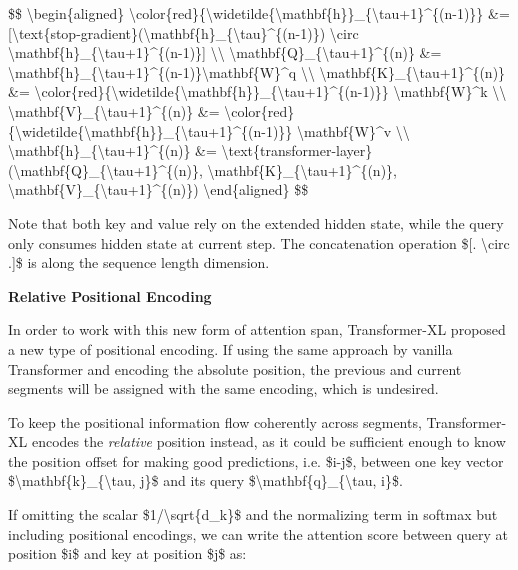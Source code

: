\$\$ \textbackslash begin\{aligned\} \textbackslash color\{red\}\{\textbackslash widetilde\{\textbackslash mathbf\{h\}\}\_\{\textbackslash tau+1\}\^{}\{(n-1)\}\} \&= {[}\textbackslash text\{stop-gradient\}(\textbackslash mathbf\{h\}\_\{\textbackslash tau\}\^{}\{(n-1)\}) \textbackslash circ \textbackslash mathbf\{h\}\_\{\textbackslash tau+1\}\^{}\{(n-1)\}{]} \textbackslash\textbackslash{} \textbackslash mathbf\{Q\}\_\{\textbackslash tau+1\}\^{}\{(n)\} \&= \textbackslash mathbf\{h\}\_\{\textbackslash tau+1\}\^{}\{(n-1)\}\textbackslash mathbf\{W\}\^{}q \textbackslash\textbackslash{} \textbackslash mathbf\{K\}\_\{\textbackslash tau+1\}\^{}\{(n)\} \&= \textbackslash color\{red\}\{\textbackslash widetilde\{\textbackslash mathbf\{h\}\}\_\{\textbackslash tau+1\}\^{}\{(n-1)\}\} \textbackslash mathbf\{W\}\^{}k \textbackslash\textbackslash{} \textbackslash mathbf\{V\}\_\{\textbackslash tau+1\}\^{}\{(n)\} \&= \textbackslash color\{red\}\{\textbackslash widetilde\{\textbackslash mathbf\{h\}\}\_\{\textbackslash tau+1\}\^{}\{(n-1)\}\} \textbackslash mathbf\{W\}\^{}v \textbackslash\textbackslash{} \textbackslash mathbf\{h\}\_\{\textbackslash tau+1\}\^{}\{(n)\} \&= \textbackslash text\{transformer-layer\}(\textbackslash mathbf\{Q\}\_\{\textbackslash tau+1\}\^{}\{(n)\}, \textbackslash mathbf\{K\}\_\{\textbackslash tau+1\}\^{}\{(n)\}, \textbackslash mathbf\{V\}\_\{\textbackslash tau+1\}\^{}\{(n)\}) \textbackslash end\{aligned\} \$\$

Note that both key and value rely on the extended hidden state, while the query only consumes hidden state at current step. The concatenation operation \${[}. \textbackslash circ .{]}\$ is along the sequence length dimension.

\textbf{Relative Positional Encoding}

In order to work with this new form of attention span, Transformer-XL proposed a new type of positional encoding. If using the same approach by vanilla Transformer and encoding the absolute position, the previous and current segments will be assigned with the same encoding, which is undesired.

To keep the positional information flow coherently across segments, Transformer-XL encodes the \emph{relative} position instead, as it could be sufficient enough to know the position offset for making good predictions, i.e. \$i-j\$, between one key vector \$\textbackslash mathbf\{k\}\_\{\textbackslash tau, j\}\$ and its query \$\textbackslash mathbf\{q\}\_\{\textbackslash tau, i\}\$.

If omitting the scalar \$1/\textbackslash sqrt\{d\_k\}\$ and the normalizing term in softmax but including positional encodings, we can write the attention score between query at position \$i\$ and key at position \$j\$ as:

